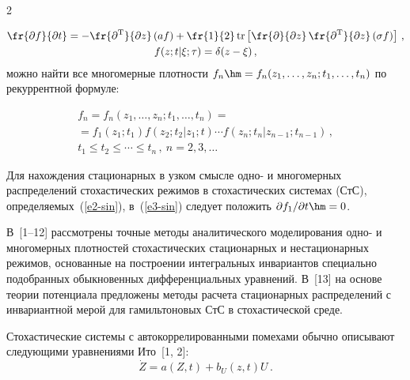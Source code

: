 \begin{multicols}{2}
    
    \noindent
    \begin{multline}
    \fr{\partial f}{\partial t} = -\fr{\partial^{\mathrm{T}}}{\partial z}\left( af\right) 
+\fr{1}{2}\,\mathrm{tr}\left[ \fr{\partial}{\partial z}\,\fr{\partial^{\mathrm{T}}}{\partial z}\left( 
\sigma f\right)\right]\,,\\
    f(z;t\vert \xi;\tau)=\delta(z-\xi)\,,
    \label{e3-sin}
    \end{multline}
можно найти все многомерные плот\-ности $f_n\hm= f_n(z_1, \ldots , z_n; 
t_1,\ldots , t_n)$ по рекуррентной фор\-муле:

\vspace*{-3pt}

\noindent
\begin{multline*}
f_n=f_n(z_1,\ldots ,z_n; t_1,\ldots ,t_n) ={}\\
{}=f_1(z_1;t_1)f(z_2;t_2\vert z_1;t)\cdots f(z_n;t_n\vert z_{n-1};t_{n-1})\,,\\
t_1\leq t_2\leq \cdots \leq t_n\,, \ 
n=2,3,\ldots
\end{multline*}


    
    Для нахождения стационарных в узком смысле одно- и многомерных 
распределений стохастических режимов в стохастических сис\-те\-мах (СтС), 
определяемых~(\ref{e2-sin}), в~(\ref{e3-sin}) следует положить $\partial  
f_1/\partial  t\hm=0$. 
    
    В~[1--12] рассмотрены точные методы аналитического моделирования 
одно- и многомерных плот\-но\-стей стохастических стационарных и 
нестационарных режимов, основанные на построении интегральных 
инвариантов специально подобранных обыкновенных дифференциальных 
уравнений. В~[13] на основе теории потенциала предложены методы расчета 
стационарных распределений с инвариантной мерой для гамильтоновых СтС в 
стохастической среде.
    
    Стохастические сис\-те\-мы с автокоррелированными помехами обычно 
описывают следующими уравнениями Ито~[1, 2]:
    \begin{equation}
    \dot{Z}=a(Z,t)+b_U(z,t)U\,.
    \label{e5-sin}
    \end{equation}
    
    

\end{multicols}
